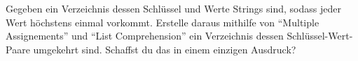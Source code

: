 \begin{aufg}
  Gegeben ein Verzeichnis dessen Schlüssel und Werte Strings sind, sodass jeder Wert höchstens einmal vorkommt.
  Erstelle daraus mithilfe von ``Multiple Assignements'' und ``List Comprehension'' ein Verzeichnis dessen Schlüssel-Wert-Paare umgekehrt sind.
  Schaffst du das in einem einzigen Ausdruck?
\end{aufg}